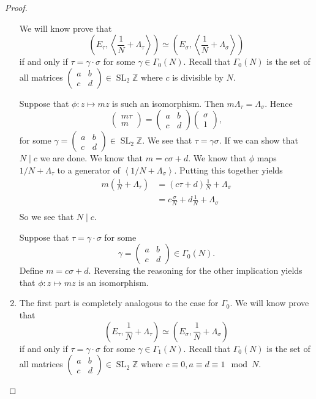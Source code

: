\documentclass[a4paper]{article}
\theoremstyle{theoremdd}
\theoremstyle{definitiondd}
\theoremstyle{remarkdd}
\newcommand{\Z}{\mathbb{Z}}
\newcommand{\ltr}{\par \noindent \framebox[1\width]{ $\implies$ } \hspace{.2cm}}
\newcommand{\rtl}{\par \noindent \framebox[1\width]{ $\impliedby$ } \hspace{.2cm} }
\DeclareMathOperator{\SL}{SL}
\begin{document}
\begin{proof}
\begin{enumerate}
	
	We will know prove that \[
		\left( E_\tau , \left<\frac{1}{N} + \Lambda_\tau \right> \right) \simeq 
		\left( E_\sigma, \left<\frac{1}{N} + \Lambda_\sigma \right> \right) 
	\]
	if and only if $\tau = \gamma \cdot \sigma$ for some $\gamma \in \Gamma_0(N)$.
	Recall that $\Gamma_0(N)$ is the set of all matrices $\begin{pmatrix} a & b \\ c & d \end{pmatrix} \in \SL_2\Z$ where $c$ is divisible by $N$. 
	\ltr Suppose that $\phi: z \mapsto m z$ is such an isomorphism. Then $m \Lambda_\tau = \Lambda_\sigma$. Hence \[
	\begin{pmatrix} m \tau \\ m \end{pmatrix}  = 
	\begin{pmatrix} a & b \\ c & d \end{pmatrix} \begin{pmatrix} \sigma \\ 1 \end{pmatrix} 
	,\] 
	for some $\gamma = \begin{pmatrix} a & b \\ c & d \end{pmatrix}  \in \SL_2\Z$. 
	We see that $\tau = \gamma \sigma$. If we can show that  $N \mathbin{\mid} c$ we are done.
	We know that $m = c \sigma + d$. 
	We know that $\phi$ maps $1 / N + \Lambda_\tau$ to a generator of $\left<1 / N + \Lambda_\sigma \right>$. 
	Putting this together yields \begin{align*}
		m\left(\frac{1}{N} + \Lambda_\tau\right) &= (c \tau + d) \frac{1}{N} + \Lambda_\sigma \\ 
		&= c \frac{\sigma}{N} + d \frac{1}{N} + \Lambda_\sigma \\
	\end{align*}
	So we see that $N \mathbin{|} c$. 
	\rtl Suppose that $\tau = \gamma \cdot \sigma$ for some \[
		\gamma = \begin{pmatrix} a & b \\ c & d  \end{pmatrix} \in \Gamma_0(N)
	.\] 
	Define  $m = c \sigma + d$. Reversing the reasoning for the other implication yields that  $\phi: z\mapsto  m z$ is an isomorphism. 

	\item The first part is completely analogous to the case for $\Gamma_0.$ 
	We will know prove that \[
		\left( E_\tau , \frac{1}{N} + \Lambda_\tau \right) \simeq 
		\left( E_\sigma, \frac{1}{N} + \Lambda_\sigma \right) 
	\]
	if and only if $\tau = \gamma \cdot \sigma$ for some $\gamma \in \Gamma_1(N)$.
	Recall that $\Gamma_0(N)$ is the set of all matrices $\begin{pmatrix} a & b \\ c & d \end{pmatrix} \in \SL_2\Z$ where $c \equiv 0, a \equiv d \equiv 1 \mod N$. 


\end{enumerate}
\end{proof}
\end{document}
